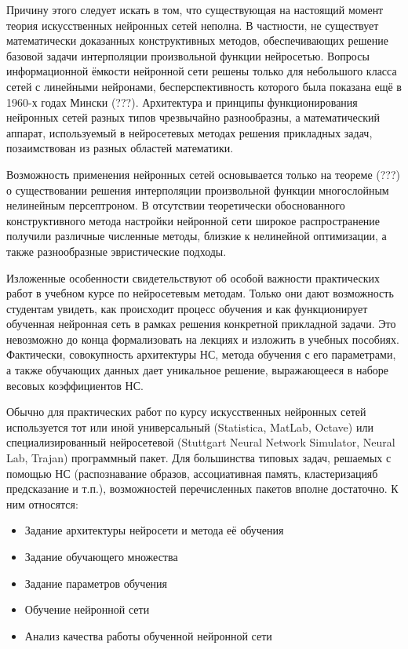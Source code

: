 Причину этого следует искать в том, что существующая на настоящий
момент теория искусственных нейронных сетей неполна.  В частности, не
существует математически доказанных конструктивных методов,
обеспечивающих решение базовой задачи интерполяции произвольной
функции нейросетью.  Вопросы информационной ёмкости нейронной сети
решены только для небольшого класса сетей с линейными нейронами,
бесперспективность которого была показана ещё в 1960-х годах Мински
(???).  Архитектура и принципы функционирования нейронных сетей разных
типов чрезвычайно разнообразны, а математический аппарат, используемый
в нейросетевых методах решения прикладных задач, позаимствован из
разных областей математики.

Возможность применения нейронных сетей основывается только на теореме
(???) о существовании решения интерполяции произвольной функции
многослойным нелинейным персептроном.  В отсутствии теоретически
обоснованного конструктивного метода настройки нейронной сети широкое
распространение получили различные численные методы, близкие к
нелинейной оптимизации, а также разнообразные эвристические подходы.

Изложенные особенности свидетельствуют об особой важности практических
работ в учебном курсе по нейросетевым методам.  Только они дают
возможность студентам увидеть, как происходит процесс обучения и как
функционирует обученная нейронная сеть в рамках решения конкретной
прикладной задачи.  Это невозможно до конца формализовать на лекциях и
изложить в учебных пособиях.  Фактически, совокупность архитектуры НС,
метода обучения с его параметрами, а также обучающих данных дает
уникальное решение, выражающееся в наборе весовых коэффициентов НС.

Обычно для практических работ по курсу искусственных нейронных сетей
используется тот или иной универсальный (Statistica, MatLab, Octave)
или специализированный нейросетевой (Stuttgart Neural Network
Simulator, Neural Lab, Trajan) программный пакет.  Для большинства
типовых задач, решаемых с помощью НС (распознавание образов,
ассоциативная память, кластеризацияб предсказание и т.п.),
возможностей перечисленных пакетов вполне достаточно.  К ним
относятся:

\begin{itemize}
\item Задание архитектуры нейросети и метода её обучения
\item Задание обучающего множества
\item Задание параметров обучения
\item Обучение нейронной сети
\item Анализ качества работы обученной нейронной сети
\end{itemize}

